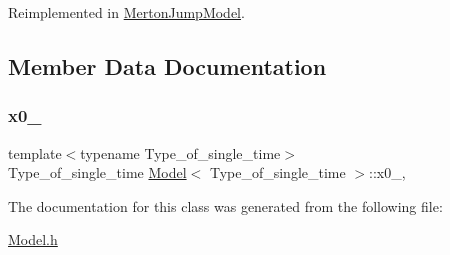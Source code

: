 Reimplemented in \hyperlink{class_merton_jump_model_aaa2a274f47e3d70b4e331df023855ddc}{Merton\+Jump\+Model}.



\subsection{Member Data Documentation}
\hypertarget{class_model_a8b547d019a51a21f539209227fbde146}{}\label{class_model_a8b547d019a51a21f539209227fbde146} 
\subsubsection{\texorpdfstring{x0\+\_\+}{x0\_}}
{\footnotesize\ttfamily template$<$typename Type\+\_\+of\+\_\+single\+\_\+time$>$ \\
Type\+\_\+of\+\_\+single\+\_\+time \hyperlink{class_model}{Model}$<$ Type\+\_\+of\+\_\+single\+\_\+time $>$\+::x0\+\_\+\hspace{0.3cm}{\ttfamily [mutable]}, {\ttfamily [protected]}}



The documentation for this class was generated from the following file\+:\begin{DoxyCompactItemize}
\item 
\hyperlink{_model_8h}{Model.\+h}\end{DoxyCompactItemize}

